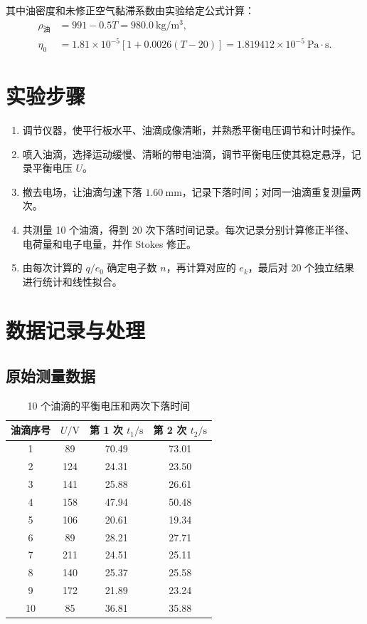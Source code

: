 \documentclass[UTF8,a4paper,12pt]{ctexart}
\begin{document}
其中油密度和未修正空气黏滞系数由实验给定公式计算：
\begin{align}
  \rho_{\text{油}}&=991-0.5T=980.0\ \mathrm{kg/m^3},\\
  \eta_0&=1.81\times10^{-5}\left[1+0.0026(T-20)\right]
  =1.819412\times10^{-5}\ \mathrm{Pa\cdot s}.
\end{align}

\section{实验步骤}
\begin{enumerate}
  \item 调节仪器，使平行板水平、油滴成像清晰，并熟悉平衡电压调节和计时操作。
  \item 喷入油滴，选择运动缓慢、清晰的带电油滴，调节平衡电压使其稳定悬浮，记录平衡电压 $U$。
  \item 撤去电场，让油滴匀速下落 $1.60\ \mathrm{mm}$，记录下落时间；对同一油滴重复测量两次。
  \item 共测量 10 个油滴，得到 20 次下落时间记录。每次记录分别计算修正半径、电荷量和电子电量，并作 Stokes 修正。
  \item 由每次计算的 $q/e_0$ 确定电子数 $n$，再计算对应的 $e_k$，最后对 20 个独立结果进行统计和线性拟合。
\end{enumerate}

\section{数据记录与处理}
\subsection{原始测量数据}
\begin{table}[htbp]
  \centering
  \caption{10 个油滴的平衡电压和两次下落时间}
  \begin{tabular}{cccc}
    \toprule
    油滴序号 & $U/\mathrm{V}$ & 第 1 次 $t_1/\mathrm{s}$ & 第 2 次 $t_2/\mathrm{s}$ \\
    \midrule
    1  & 89  & 70.49 & 73.01 \\
    2  & 124 & 24.31 & 23.50 \\
    3  & 141 & 25.88 & 26.61 \\
    4  & 158 & 47.94 & 50.48 \\
    5  & 106 & 20.61 & 19.34 \\
    6  & 89  & 28.21 & 27.71 \\
    7  & 211 & 24.51 & 25.11 \\
    8  & 140 & 25.37 & 25.58 \\
    9  & 172 & 21.89 & 23.24 \\
    10 & 85  & 36.81 & 35.88 \\
    \bottomrule
  \end{tabular}
\end{table}
\end{document}
